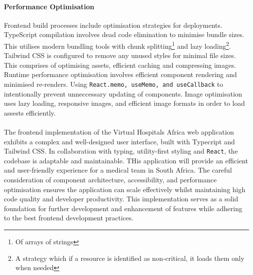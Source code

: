 \paragraph{Performance Optimisation}\mbox{}

Frontend build processes include optimisation strategies for deployments. TypeScript compilation involves dead code elimination to minimise bundle sizes. This utilises modern bundling tools with chunk splitting\footnote{Of arrays of strings} and lazy loading\footnote{\label{fn:lazy}A strategy which if a resource is identified as non-critical, it loads them only when needed}.
Tailwind CSS is configured to remove any unused styles for minimal file sizes. This comprises of optimising assets, efficient caching and compressing images.
Runtime performance optimisation involves efficient component rendering and minimised re-renders. Using \texttt{React.memo, useMemo, and useCallback} to intentionally prevent unneccessary updating of components. Image optimisation uses lazy loading, responsive images, and efficient image formats in order to load assests efficiently.

\paragraph{}\mbox{}
The frontend implementation of the Virtual Hospitals Africa web application exhibits a complex and well-designed user interface, built with Typecript and Tailwind CSS. In collaboration with typing, utility-first styling and \texttt{React}, the codebase is adaptable and maintainable. THis application will provide an efficient and user-friendly experience for a medical team in South Africa. The careful consideration of component architecture, accessibility, and performance optimisation ensures the application can scale effectively whilst maintaining high code quality and developer productivity. This implementation serves as a solid foundation for further development and enhancement of features while adhering to the best frontend development practices.
